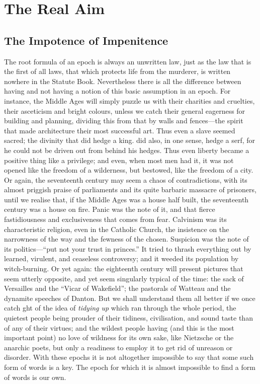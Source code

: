 \documentclass{book}
\begin{document}
\setcounter{chapter}{0}\part{The Real Aim}
\label{chapter-10}
\chapter{The Impotence of Impenitence}
\label{chapter-11}
The root formula of an epoch is always an unwritten law, just as the law that is the first of all laws, that which protects life from the murderer, is written nowhere in the Statute Book. Nevertheless there is all the difference between having and not having a notion of this basic assumption in an epoch. For instance, the Middle Ages will simply puzzle us with their charities and cruelties, their asceticism and bright colours, unless we catch their general eagerness for building and planning, dividing this from that by walls and fences—the spirit that made architecture their most successful art. Thus even a slave seemed sacred; the divinity that did hedge a king. did also, in one sense, hedge a serf, for he could not be driven out from behind his hedges. Thus even liberty became a positive thing like a privilege; and even, when most men had it, it was not opened like the freedom of a wilderness, but bestowed, like the freedom of a city. Or again, the seventeenth century may seem a chaos of contradictions, with its almost priggish praise of parliaments and its quite barbaric massacre of prisoners, until we realise that, if the Middle Ages was a house half built, the seventeenth century was a house on fire. Panic was the note of it, and that fierce fastidiousness and exclusiveness that comes from fear. Calvinism was its characteristic religion, even in the Catholic Church, the insistence on the narrowness of the way and the fewness of the chosen. Suspicion was the note of its politics—“put not your trust in princes.” It tried to thrash everything out by learned, virulent, and ceaseless controversy; and it weeded its population by witch-burning. Or yet again: the eighteenth century will present pictures that seem utterly opposite, and yet seem singularly typical of the time: the sack of Versailles and the “Vicar of Wakefield”; the pastorals of Watteau and the dynamite speeches of Danton. But we shall understand them all better if we once catch ght of the idea of \emph{tidying up} which ran through the whole period, the quietest people being prouder of their tidiness, civilisation, and sound taste than of any of their virtues; and the wildest people having (and this is the most important point) no love of wildness for its own sake, like Nietzsche or the anarchic poets, but only a readiness to employ it to get rid of unreason or disorder. With these epochs it is not altogether impossible to say that some such form of words is a key. The epoch for which it is almost impossible to find a form of words is our own.
\end{document}
